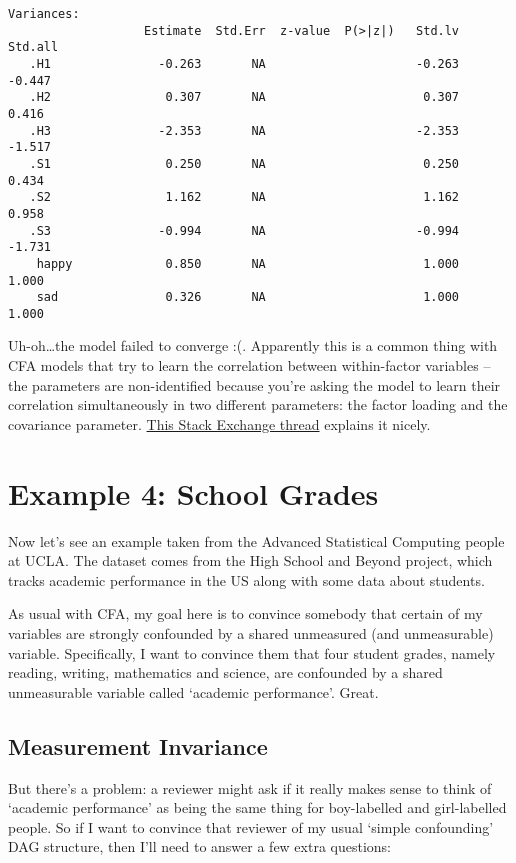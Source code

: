 \documentclass[
  letterpaper,
  DIV=11,
  numbers=noendperiod]{scrreprt}
\begin{document}
\begin{verbatim}
Variances:
                   Estimate  Std.Err  z-value  P(>|z|)   Std.lv  Std.all
   .H1               -0.263       NA                     -0.263   -0.447
   .H2                0.307       NA                      0.307    0.416
   .H3               -2.353       NA                     -2.353   -1.517
   .S1                0.250       NA                      0.250    0.434
   .S2                1.162       NA                      1.162    0.958
   .S3               -0.994       NA                     -0.994   -1.731
    happy             0.850       NA                      1.000    1.000
    sad               0.326       NA                      1.000    1.000
\end{verbatim}

Uh-oh\ldots the model failed to converge :(. Apparently this is a common
thing with CFA models that try to learn the correlation between
within-factor variables -- the parameters are non-identified because
you're asking the model to learn their correlation simultaneously in two
different parameters: the factor loading and the covariance parameter.
\href{https://stackoverflow.com/questions/44114501/model-identification-in-lavaan-for-r}{This
Stack Exchange thread} explains it nicely.

\hypertarget{example-4-school-grades}{%
\section{Example 4: School Grades}\label{example-4-school-grades}}

Now let's see an example taken from the Advanced Statistical Computing
people at UCLA. The dataset comes from the High School and Beyond
project, which tracks academic performance in the US along with some
data about students.

As usual with CFA, my goal here is to convince somebody that certain of
my variables are strongly confounded by a shared unmeasured (and
unmeasurable) variable. Specifically, I want to convince them that four
student grades, namely reading, writing, mathematics and science, are
confounded by a shared unmeasurable variable called `academic
performance'. Great.

\hypertarget{measurement-invariance}{%
\subsection{Measurement Invariance}\label{measurement-invariance}}

But there's a problem: a reviewer might ask if it really makes sense to
think of `academic performance' as being the same thing for boy-labelled
and girl-labelled people. So if I want to convince that reviewer of my
usual `simple confounding' DAG structure, then I'll need to answer a few
extra questions:
\end{document}
